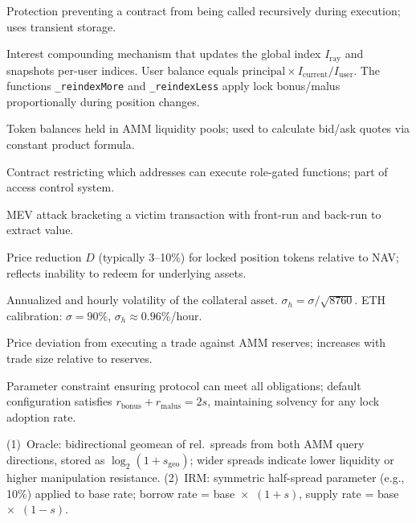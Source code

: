 \documentclass[10pt,a4paper,twocolumn]{article}
\theoremstyle{definition}
\theoremstyle{plain}
\theoremstyle{remark}
\begin{document}
\begin{description}[style=nextline, leftmargin=2.5em, labelindent=0em, font=\normalfont\bfseries]
\item[Reentrancy Guard] Protection preventing a contract from being called recursively during execution; uses transient storage.

\item[Reindex] Interest compounding mechanism that updates the global index $I_{\text{ray}}$ and snapshots per-user indices. User balance equals $\text{principal} \times I_{\text{current}} / I_{\text{user}}$. The functions \texttt{\_reindexMore} and \texttt{\_reindexLess} apply lock bonus/malus proportionally during position changes.

\item[Reserves] Token balances held in AMM liquidity pools; used to calculate bid/ask quotes via constant product formula.

\item[Role Guard] Contract restricting which addresses can execute role-gated functions; part of access control system.


\item[Sandwich Attack] MEV attack bracketing a victim transaction with front-run and back-run to extract value.

\item[Secondary Market Discount] Price reduction $D$ (typically 3--10\%) for locked position tokens relative to NAV; reflects inability to redeem for underlying assets.

\item[$\sigma$, $\sigma_h$\,$\dagger$] Annualized and hourly volatility of the collateral asset. $\sigma_h = \sigma / \sqrt{8760}$. ETH calibration: $\sigma = 90\%$, $\sigma_h \approx 0.96\%$/hour.

\item[Slippage] Price deviation from executing a trade against AMM reserves; increases with trade size relative to reserves.

\item[Solvency Boundary] Parameter constraint ensuring protocol can meet all obligations; default configuration satisfies $r_{\text{bonus}} + r_{\text{malus}} = 2s$, maintaining solvency for any lock adoption rate.

\item[Spread] (1)~Oracle: bidirectional geomean of rel.\ spreads from both AMM query directions, stored as $\log_2(1 + s_{\text{geo}})$; wider spreads indicate lower liquidity or higher manipulation resistance. (2)~IRM: symmetric half-spread parameter (e.g., 10\%) applied to base rate; borrow rate = base~$\times$~$(1{+}s)$, supply rate = base~$\times$~$(1{-}s)$.


\end{description}
\end{document}
